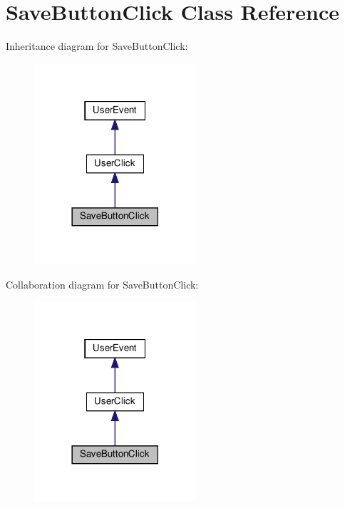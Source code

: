 \hypertarget{classSaveButtonClick}{}\section{Save\+Button\+Click Class Reference}
\label{classSaveButtonClick}


Inheritance diagram for Save\+Button\+Click\+:\nopagebreak
\begin{figure}[H]
\begin{center}
\leavevmode
\includegraphics[width=170pt]{classSaveButtonClick__inherit__graph}
\end{center}
\end{figure}


Collaboration diagram for Save\+Button\+Click\+:\nopagebreak
\begin{figure}[H]
\begin{center}
\leavevmode
\includegraphics[width=170pt]{classSaveButtonClick__coll__graph}
\end{center}
\end{figure}
